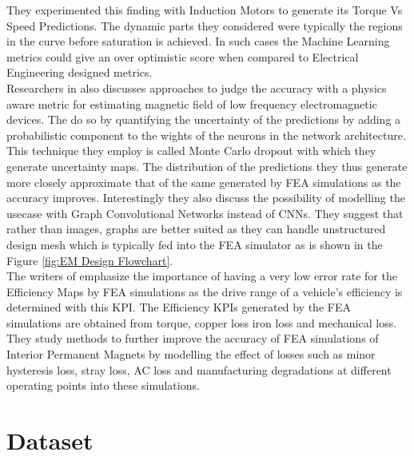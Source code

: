 \documentclass{report} %
\begin{document}
They experimented this finding with Induction Motors to generate its Torque Vs Speed Predictions. The dynamic parts they considered 
were typically the regions in the curve before saturation is achieved. 
In such cases the Machine Learning metrics could give an over optimistic score when compared to Electrical Engineering designed metrics.\\
Researchers in \cite{DL-MF-2019} also discusses approaches to judge the accuracy with a physics aware metric for estimating 
magnetic field of low frequency electromagnetic devices. The do so by quantifying the uncertainty of the predictions by adding 
a probabilistic component to the wights of the neurons in the network architecture. This technique they employ is called Monte Carlo dropout 
with which they generate uncertainty maps. 
The distribution of the predictions they thus generate more closely approximate that of the same generated by \ac{FEA} simulations as the accuracy improves.
Interestingly they also discuss the possibility of modelling the usecase with Graph Convolutional Networks instead of \ac{CNN}s.
They suggest that rather than images, graphs are better suited as they can handle unstructured design mesh which is 
typically fed into the \ac{FEA} simulator as is shown in the Figure \ref{fig:EM Design Flowchart}.\\
The writers of \cite{ETA-LA-2020} emphasize the importance of having a very low error rate for the Efficiency Maps by \ac{FEA} simulations 
as the drive range of a vehicle's efficiency is determined with this \ac{KPI}. 
The Efficiency \ac{KPI}s generated by the \ac{FEA} simulations are obtained from torque, copper loss iron loss and mechanical loss.
They study methods to further improve the accuracy of \ac{FEA} simulations of Interior Permanent Magnets by modelling the effect 
of losses such as minor hysteresis loss, stray loss, AC loss and manufacturing degradations at different operating points into these simulations.\\

\newpage 

\chapter{Dataset} 
\end{document}
